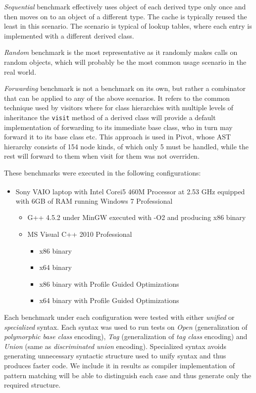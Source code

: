 \documentclass[preprint]{sigplanconf}
\makeatletter
\DeclareRobustCommand{\code}[1]{{\lstinline[breaklines=false,escapechar=@]{#1}}}
\makeatother
\begin{document}
\emph{Sequential} benchmark effectively uses object of each derived type only 
once and then moves on to an object of a different type. The cache is typically 
reused the least in this scenario. The scenario is typical of lookup tables, 
where each entry is implemented with a different derived class.

\emph{Random} benchmark is the most representative as it randomly makes calls on 
random objects, which will probably be the most common usage scenario in the 
real world.

\emph{Forwarding} benchmark is not a benchmark on its own, but rather a 
combinator that can be applied to any of the above scenarios. It refers to the 
common technique used by visitors where for class hierarchies with multiple 
levels of inheritance the \code{visit} method of a derived class will provide a 
default implementation of forwarding to its immediate base class, who in turn 
may forward it to its base class etc. This approach is used in Pivot, whose AST 
hierarchy consists of 154 node kinds, of which only 5 must be handled, while the 
rest will forward to them when visit for them was not overriden.

These benchmarks were executed in the following configurations:

\begin{itemize}
\item Sony VAIO\textsuperscript{\textregistered} laptop with Intel\textsuperscript{\textregistered} Core\texttrademark i5 460M 
      Processor at 2.53 GHz equipped with 6GB of RAM running Windows 7 
      Professional
      \begin{itemize}
      \item G++ 4.5.2 under MinGW executed with -O2 and producing x86 binary
      \item MS Visual C++ 2010 Professional
            \begin{itemize}
            \item x86 binary
            \item x64 binary
            \item x86 binary with Profile Guided Optimizations
            \item x64 binary with Profile Guided Optimizations
            \end{itemize}
      \end{itemize}
\end{itemize}

Each benchmark under each configuration were tested with either \emph{unified} 
or \emph{specialized} syntax. Each syntax was used to run tests on \emph{Open} 
(generalization of \emph{polymorphic base class} encoding), \emph{Tag} 
(generalization of \emph{tag class} encoding) and \emph{Union} (same as 
\emph{discriminated union} encoding). Specialized syntax avoids generating 
unnecessary syntactic structure used to unify syntax and thus produces faster 
code. We include it in results as compiler implementation of pattern matching 
will be able to distinguish each case and thus generate only the required 
structure.
\end{document}
